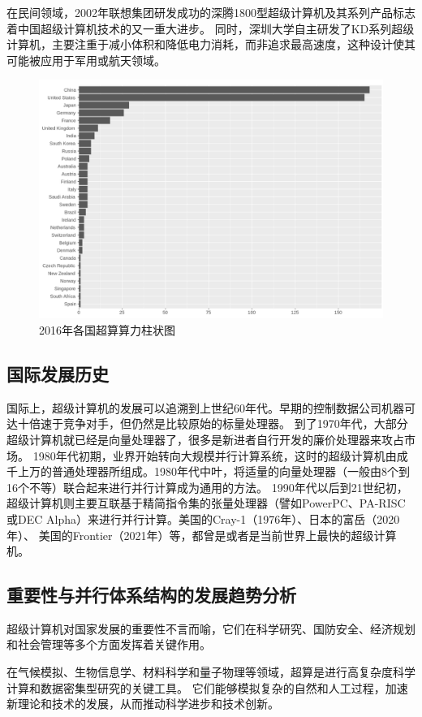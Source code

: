 \documentclass{ctexart}
\begin{document}
在民间领域，2002年联想集团研发成功的深腾1800型超级计算机及其系列产品标志着中国超级计算机技术的又一重大进步。
同时，深圳大学自主研发了KD系列超级计算机，主要注重于减小体积和降低电力消耗，而非追求最高速度，这种设计使其可能被应用于军用或航天领域。
\begin{figure}[h]
    \centering
    \includegraphics[width=\linewidth]{top500_supercomputers_by_country.png}
    \caption{2016年各国超算算力柱状图}
\end{figure}
\subsection{国际发展历史}
国际上，超级计算机的发展可以追溯到上世纪60年代。早期的控制数据公司机器可达十倍速于竞争对手，但仍然是比较原始的标量处理器。
到了1970年代，大部分超级计算机就已经是向量处理器了，很多是新进者自行开发的廉价处理器来攻占市场。
1980年代初期，业界开始转向大规模并行计算系统，这时的超级计算机由成千上万的普通处理器所组成。1980年代中叶，将适量的向量处理器（一般由8个到16个不等）联合起来进行并行计算成为通用的方法。
1990年代以后到21世纪初，超级计算机则主要互联基于精简指令集的张量处理器（譬如PowerPC、PA-RISC或DEC Alpha）来进行并行计算。美国的Cray-1（1976年）、日本的富岳（2020年）、
美国的Frontier（2021年）等，都曾是或者是当前世界上最快的超级计算机。
\subsection{重要性与并行体系结构的发展趋势分析}
超级计算机对国家发展的重要性不言而喻，它们在科学研究、国防安全、经济规划和社会管理等多个方面发挥着关键作用。

在气候模拟、生物信息学、材料科学和量子物理等领域，超算是进行高复杂度科学计算和数据密集型研究的关键工具。
它们能够模拟复杂的自然和人工过程，加速新理论和技术的发展，从而推动科学进步和技术创新。
\end{document}
